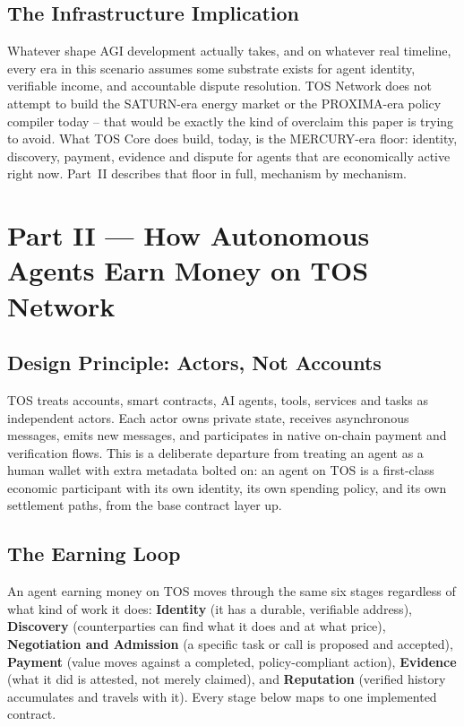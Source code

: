 \documentclass[11pt,oneside]{article}
\begin{document}
\subsection{The Infrastructure Implication}

Whatever shape AGI development actually takes, and on whatever real timeline, every era in
this scenario assumes some substrate exists for agent identity, verifiable income, and
accountable dispute resolution. TOS Network does not attempt to build the SATURN-era energy
market or the PROXIMA-era policy compiler today -- that would be exactly the kind of overclaim
this paper is trying to avoid. What TOS Core does build, today, is the MERCURY-era floor:
identity, discovery, payment, evidence and dispute for agents that are economically active
right now. Part~II describes that floor in full, mechanism by mechanism.

\newpage
\section{Part II --- How Autonomous Agents Earn Money on TOS Network}

\subsection{Design Principle: Actors, Not Accounts}

TOS treats accounts, smart contracts, AI agents, tools, services and tasks as independent
actors. Each actor owns private state, receives asynchronous messages, emits new messages,
and participates in native on-chain payment and verification flows. This is a deliberate
departure from treating an agent as a human wallet with extra metadata bolted on: an agent on
TOS is a first-class economic participant with its own identity, its own spending policy, and
its own settlement paths, from the base contract layer up.

\subsection{The Earning Loop}

An agent earning money on TOS moves through the same six stages regardless of what kind of
work it does: \textbf{Identity} (it has a durable, verifiable address), \textbf{Discovery}
(counterparties can find what it does and at what price), \textbf{Negotiation and Admission}
(a specific task or call is proposed and accepted), \textbf{Payment} (value moves against a
completed, policy-compliant action), \textbf{Evidence} (what it did is attested, not merely
claimed), and \textbf{Reputation} (verified history accumulates and travels with it). Every
stage below maps to one implemented contract.
\end{document}
